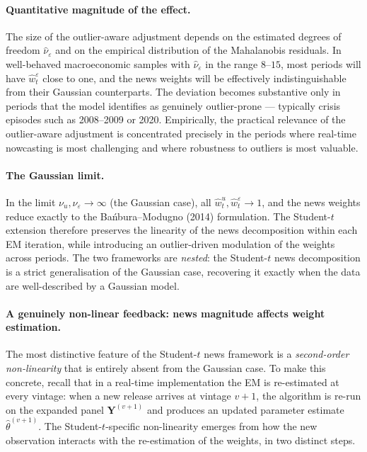 \documentclass[11pt, a4paper, oneside]{article}
\begin{document}
\paragraph{Quantitative magnitude of the effect.}
The size of the outlier-aware adjustment depends on the estimated
degrees of freedom $\hat{\nu}_\varepsilon$ and on the empirical
distribution of the Mahalanobis residuals. In well-behaved
macroeconomic samples with $\hat{\nu}_\varepsilon$ in the range
$8$--$15$, most periods will have $\hat{w}^\varepsilon_t$ close to
one, and the news weights will be effectively indistinguishable from
their Gaussian counterparts. The deviation becomes substantive only
in periods that the model identifies as genuinely outlier-prone —
typically crisis episodes such as 2008--2009 or 2020. Empirically,
the practical relevance of the outlier-aware adjustment is
concentrated precisely in the periods where real-time nowcasting
is most challenging and where robustness to outliers is most valuable.

\paragraph{The Gaussian limit.}
In the limit $\nu_u, \nu_\varepsilon \to \infty$ (the Gaussian case),
all $\hat{w}^u_t, \hat{w}^\varepsilon_t \to 1$, and the news weights
reduce exactly to the Ba\'nbura--Modugno (2014) formulation. The
Student-$t$ extension therefore preserves the linearity of the news
decomposition within each EM iteration, while introducing an
outlier-driven modulation of the weights across periods. The two
frameworks are \emph{nested}: the Student-$t$ news decomposition is
a strict generalisation of the Gaussian case, recovering it exactly
when the data are well-described by a Gaussian model.

\paragraph{A genuinely non-linear feedback: news magnitude affects weight estimation.}
The most distinctive feature of the Student-$t$ news framework is a
\emph{second-order non-linearity} that is entirely absent from the
Gaussian case. To make this concrete, recall that in a real-time
implementation the EM is re-estimated at every vintage: when a new
release arrives at vintage $v+1$, the algorithm is re-run on the
expanded panel $\mathbf{Y}^{(v+1)}$ and produces an updated parameter
estimate $\hat{\theta}^{(v+1)}$. The Student-$t$-specific
non-linearity emerges from how the new observation interacts with the
re-estimation of the weights, in two distinct steps.
\end{document}
